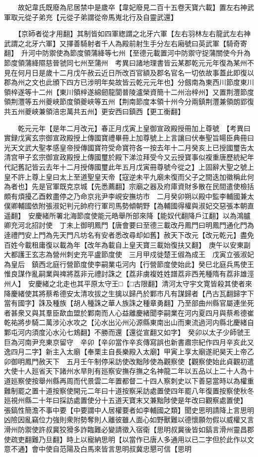 　　故妃韋氏既廢為尼居禁中是歲卒【韋妃廢見二百十五卷天寶六載】置左右神武軍取元從子弟充【元從子弟謂從帝馬嵬北行及自靈武還】

　　【京師者從才用翻】其制皆如四軍緫謂之北牙六軍【左右羽林左右龍武左右神武謂之北牙六軍】又擇善騎射者千人為殿前射生手分左右廂號曰英武軍【騎奇寄翻】　升河中防禦使為節度領蒲絳等七州【至德元載置河中防禦守捉蒲關使今升為節度領蒲絳隰慈晉虢同七州至蒲州　考異曰諸地理書皆云某郡乾元元年復為某州不見在何月日是歲十二月戊午赦云近日所改百官額及郡名官名一切依故事蓋此即復以郡為州之文也此頒下四方已涉明年矣故皆云乾元元年也】分劔南為東西川節度東川領梓遂等十二州【東川領梓遂綿劒龍閬普陵瀘榮資簡十二州治梓州】又置荆灃節度領荆灃等五州夔峽節度領夔峽等五州【荆南節度本領十州今分兩鎮荆灃兼領朗郢復共五州夔峽兼領涪忠萬共五州】更安西曰鎮西【更工衡翻】

　　乾元元年【是年二月改元】春正月戊寅上皇御宣政殿授冊加上尊號　【考異曰實録戊寅玄宗御宣政殿授上傳國寶禮畢冊上加尊號上上言讓曰伏奉聖旨䁑臣典冊曰光天文武大聖孝感皇帝授傳國寶符受命寶符各一按去年十二月癸亥上已授國璽告太清宫甲子玄宗御宣政殿授上傳國璽於殿下涕泣拜受今又云授寶事似複重唐歷統紀年代記舊記皆云去年十二月授傳國璽此年五月戊寅冊尊號今從之】上固辭大聖之號上皇不許上尊上皇曰太上至道聖皇天帝【寇逆未平九廟未復而父子之間迭加徽稱此何為者也】先是官軍既克京城【先悉薦翻】宗廟之器及府庫資財多散在民間遣使檢括頗有煩擾乙酉敕盡停之乃命京兆尹李峴安撫坊市　二月癸卯朔以殿中監李輔國兼太僕卿輔國依附張淑妃判元帥府行軍司馬勢傾朝野【為輔國得權與淑妃交惡張本朝直遥翻】　安慶緒所署北海節度使能元皓舉所部來降【能奴代翻降戶江翻】以為鴻臚卿充河北招討使　丁未上御明鳳門【唐會要曰至德三載改丹鳳門曰明鳳門通化門為逹禮門安上門為先天門凡坊名有安者悉改尋却如舊】赦天下改元【改元乾元】盡免百姓今載租庸復以載為年【改年為載自上皇天寶三載始復扶又翻】　庚午以安東副大都護王玄志為營州刺史充平盧節度使　三月甲戍徙楚王俶為成王　戊寅立張淑妃為皇后　鎮西北庭行營節度使李嗣業屯河内【行營節度使始此】癸巳北庭兵馬使王惟良謀作亂嗣業與禆將荔非元禮討誅之【荔非虜複姓姓譜荔非西羌種隋有荔非雄涇州人】　安慶緒之北走也其平原太守王□【□古限翻】清河太守宇文寛皆殺其使者來降慶緒使其將蔡希德安太清攻拔之生擒以歸冎於鄴市凡有謀歸者【冎古瓦翻歸字下當有國字】誅及種族【胡人種誅之華人族誅之種章勇翻】乃至部曲州縣官屬連坐死者甚衆又與其羣臣歃血盟於鄴南而人心益離慶緒聞李嗣業在河内夏四月與蔡希德崔乾祐將步騎二萬涉沁水攻之【沁水出沁州沁源縣東南出山而東流過河内縣北慶緒自鄴屯河内須度沁水沁七鴆翻】不勝而還【還從宣翻又如字】　癸卯以太子少師虢王巨為河南尹充東京留守　辛卯【辛卯當作辛亥傳寫誤也新書肅宗紀作四月辛亥此又逸四月二字】新主入太廟【奉栗主自長樂殿入太廟】甲寅上享太廟遂祀昊天上帝乙卯御明鳳門赦天下　五月壬午制停采訪使改黜陟使為觀察使【觀察使始此貞觀初遣大使十人廵省天下諸州水旱則有廵察安撫存撫之名神龍二年以五品以上二十人為十道廵察使按舉州縣再周而代景雲二年置都督二十四人察刺史以下善惡當時以為權重難制罷之置十道按察使開元二年曰十道按察采訪處置使四年罷八年復置按察使秋冬廵視州縣二十年曰採訪處置使分十五道天寶末又兼黜陟使是年改曰觀察處置使】　張鎬性簡澹不事中要【中要謂中人居權要者如李輔國之類】聞史思明請降上言思明凶險因亂竊位力強則衆附勢奪則人離彼雖人面心如野獸難以德懷願勿假以威權又言滑州防禦使許叔冀狡猾多詐臨難必變請徵入宿衛【思明叔冀後皆如鎬言滑州靈昌郡使疏吏翻難乃旦翻】時上以寵納思明【以當作已唐人多通用以已二字但於此作以文意不通】會中使自范陽及白馬來皆言思明叔冀忠懇可信【思明